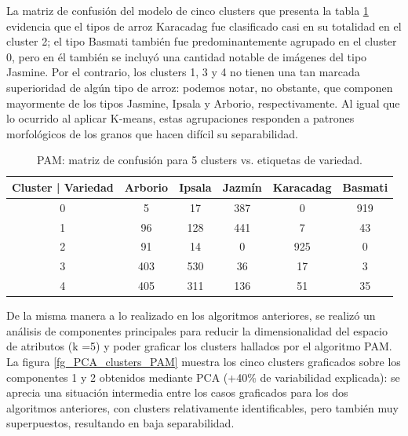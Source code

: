 \documentclass{article}
\begin{document}
La matriz de confusión del modelo de cinco clusters que presenta la tabla \ref{tab:mc_PAM5} evidencia que el tipos de arroz Karacadag fue clasificado casi en su totalidad en el cluster 2;  el tipo Basmati también fue predominantemente agrupado en el cluster 0, pero en él también se incluyó una cantidad notable de imágenes del tipo Jasmine.
Por el contrario, los clusters 1, 3 y 4 no tienen una tan marcada superioridad de algún tipo de arroz: podemos notar, no obstante, que componen mayormente de los tipos Jasmine, Ipsala y Arborio, respectivamente. Al igual que lo ocurrido al aplicar K-means, estas agrupaciones responden a patrones morfológicos de los granos que hacen difícil su separabilidad.

\begin{table}[!htb]
    \centering
    \begin{tabular}{cccccc}
    \toprule
    Cluster | Variedad &  Arborio &  Ipsala &  Jazmín &  Karacadag & Basmati\\
    \midrule
    0 & 5 & 17 & 387 & 0 & 919 \\
    1 & 96 & 128 & 441 & 7 & 43 \\
    2 & 91 & 14 & 0 & 925 & 0 \\
    3 & 403 & 530 & 36 & 17 & 3 \\
    4 & 405 & 311 & 136 & 51 & 35 \\
    \bottomrule
    \end{tabular}
    \caption{PAM: matriz de confusión para 5 clusters vs. etiquetas de variedad.}
    \label{tab:mc_PAM5}
\end{table}

De la misma manera a lo realizado en los algoritmos anteriores, se realizó un análisis de componentes principales para reducir la dimensionalidad del espacio de atributos (k =5) y poder graficar los clusters hallados por el algoritmo PAM.
La figura \ref{fg_PCA_clusters_PAM} muestra los cinco clusters graficados sobre los componentes 1 y 2 obtenidos mediante PCA (+40\% de variabilidad explicada): se aprecia una situación intermedia entre los casos graficados para los dos algoritmos anteriores, con clusters relativamente identificables, pero también muy superpuestos, resultando en baja separabilidad.
\end{document}
